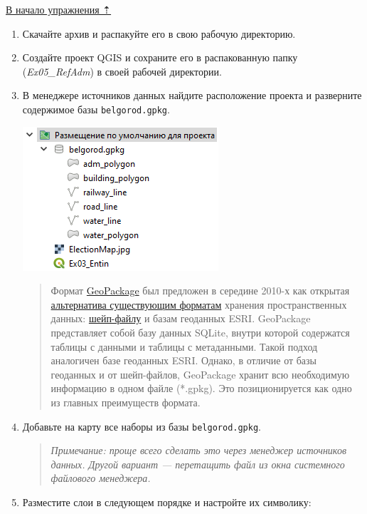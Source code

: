\documentclass[
  12pt,
]{book}
\begin{document}
\protect\hyperlink{map-ref-districts}{В начало упражнения ⇡}

\begin{enumerate}
\def\labelenumi{\arabic{enumi}.}
\item
  Скачайте архив и распакуйте его в свою рабочую директорию.
\item
  Создайте проект QGIS и сохраните его в распакованную папку (\emph{Ex05\_RefAdm}) в своей рабочей директории.
\item
  В менеджере источников данных найдите расположение проекта и разверните содержимое базы \texttt{belgorod.gpkg}.

  \includegraphics{images/Ex05/GeoPackage_structure.png}

  \begin{quote}
  Формат \href{http://www.geopackage.org/}{GeoPackage} был предложен в середине 2010-х как открытая \href{https://imgs.xkcd.com/comics/standards.png}{альтернатива существующим форматам} хранения пространственных данных: \href{http://switchfromshapefile.org/\#shapefileisbad}{шейп-файлу} и базам геоданных ESRI. GeoPackage представляет собой базу данных SQLite, внутри которой содержатся таблицы с данными и таблицы с метаданными. Такой подход аналогичен базе геоданных ESRI. Однако, в отличие от базы геоданных и от шейп-файлов, GeoPackage хранит всю необходимую информацию в одном файле (*.gpkg). Это позиционируется как одно из главных преимуществ формата.
  \end{quote}
\item
  Добавьте на карту все наборы из базы \texttt{belgorod.gpkg}.

  \begin{quote}
  \emph{Примечание: проще всего сделать это через менеджер источников данных. Другой вариант --- перетащить файл из окна системного файлового менеджера.}
  \end{quote}
\item
  Разместите слои в следующем порядке и настройте их символику:


\end{enumerate}
\end{document}
